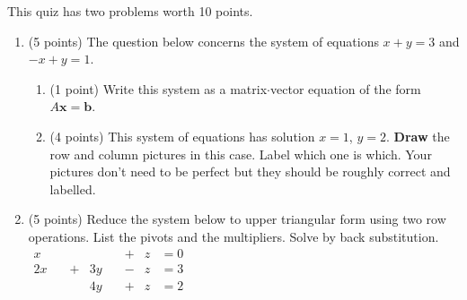 \documentclass[11pt,fleqn]{article}
\begin{document}
\renewcommand{\headrulewidth}{0pt}
\newcommand{\blank}[1]{\rule{#1}{0.75pt}}
\renewcommand{\d}{\displaystyle}

This quiz has two problems worth 10 points.
\begin{enumerate}
\item (5 points) The question below concerns the system of equations $x+y=3$ and $-x+y=1.$ 
	\begin{enumerate}
	\item (1 point) Write this system as a matrix$\cdot$vector equation of the form $A \textbf{x} = \textbf{b}.$
	\vspace{1in}
	\item (4 points) This system of equations has solution $x=1$, $y=2.$ \textbf{Draw} the row and column pictures in this case. Label which one is which. Your pictures don't need to be perfect but they should be roughly correct and labelled.
	\vfill
	
	\vfill
	\end{enumerate}
	
\newpage
\thispagestyle{plain}

\item (5 points) Reduce the system below to upper triangular form using two row operations. List the pivots and the multipliers. Solve by back substitution.\\

$
\begin{aligned}
x \quad&&&+& z &= 0 \\
2x \quad &+&3y \quad&-&z &= 3\\
&&4y \quad&+&z&=2
\end{aligned}
$
\end{enumerate}
\end{document}
